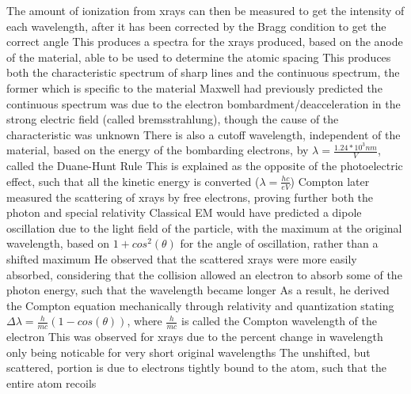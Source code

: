 \documentclass[11 pt, twoside]{article}
\newenvironment{outline*}
{
	\begin{outline}[enumerate]
	}
	{\end{outline}
}
\begin{document}
\begin{outline*}
		\3 The amount of ionization from xrays can then be measured to get the intensity of each wavelength, after it has been corrected by the Bragg condition to get the correct angle
	\2 This produces a spectra for the xrays produced, based on the anode of the material, able to be used to determine the atomic spacing
		\3 This produces both the characteristic spectrum of sharp lines and the continuous spectrum, the former which is specific to the material
			\4 Maxwell had previously predicted the continuous spectrum was due to the electron bombardment/deacceleration in the strong electric field (called bremsstrahlung), though the cause of the characteristic was unknown
		\3 There is also a cutoff wavelength, independent of the material, based on the energy of the bombarding electrons, by $\lambda = \frac{1.24 * 10^3 nm}{V}$, called the Duane-Hunt Rule
			\4 This is explained as the opposite of the photoelectric effect, such that all the kinetic energy is converted ($\lambda = \frac{hc}{eV}$)
\1 Compton later measured the scattering of xrays by free electrons, proving further both the photon and special relativity
	\2 Classical EM would have predicted a dipole oscillation due to the light field of the particle, with the maximum at the original wavelength, based on $1 + cos^2(\theta)$ for the angle of oscillation, rather than a shifted maximum
	\2 He observed that the scattered xrays were more easily absorbed, considering that the collision allowed an electron to absorb some of the photon energy, such that the wavelength became longer
	\2 As a result, he derived the Compton equation mechanically through relativity and quantization stating $\Delta \lambda = \frac{h}{mc}(1 - cos(\theta))$, where $\frac{h}{mc}$ is called the Compton wavelength of the electron
		\3 This was observed for xrays due to the percent change in wavelength only being noticable for very short original wavelengths
		\3 The unshifted, but scattered, portion is due to electrons tightly bound to the atom, such that the entire atom recoils
\end{outline*}
\end{document}
